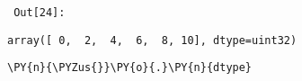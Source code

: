         {\par%
        \vspace{-1\smallerfontscale}%
        \noindent%
        \begin{minipage}{\cellleftmargin}%
    \hfill%
    {\smaller%
    \tt%
    \color{nbframe-out-prompt}%
    Out[24]:}%
    \hspace{\inputpadding}%
    \hspace{0em}%
    \hspace{3pt}%
    \end{minipage}%
        }%
    \begin{addmargin}[\cellleftmargin]{0em}%
    {\smaller%
    \vspace{-1\smallerfontscale}%
    
    
    
    \begin{verbatim}
array([ 0,  2,  4,  6,  8, 10], dtype=uint32)
    \end{verbatim}

    
}%
    \end{addmargin}%

{\par%
\vspace{-1\baselineskip}%
}%
\begin{notebookcell}[25]%
\begin{addmargin}[\cellleftmargin]{0em}%
{\smaller%
\par%
%
\vspace{-1\smallerfontscale}%
\begin{Verbatim}[commandchars=\\\{\}]
\PY{n}{\PYZus{}}\PY{o}{.}\PY{n}{dtype}
\end{Verbatim}
%
\par%
\vspace{-1\smallerfontscale}}%
\end{addmargin}
\end{notebookcell}

\par\vspace{1\smallerfontscale}%
    
